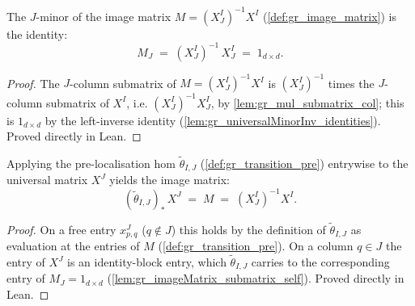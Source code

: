 \begin{lemma}

  \label{lem:gr_imageMatrix_submatrix_self}
  The \(J\)-minor of the image matrix \(M = (X^I_J)^{-1} X^I\)
  (\cref{def:gr_image_matrix}) is the identity:
  \[
    M_J \;=\; (X^I_J)^{-1}\, X^I_J \;=\; 1_{d\times d}.
  \]
\end{lemma}
\begin{proof}

\leanok
  The \(J\)-column submatrix of \(M = (X^I_J)^{-1} X^I\) is
  \((X^I_J)^{-1}\) times the \(J\)-column submatrix of \(X^I\), i.e.
  \((X^I_J)^{-1} X^I_J\), by \cref{lem:gr_mul_submatrix_col}; this is
  \(1_{d\times d}\) by the left-inverse identity
  (\cref{lem:gr_universalMinorInv_identities}). Proved directly in Lean.
\end{proof}


\begin{lemma}

  \label{lem:gr_universalMatrix_map_transitionPreMap}
  Applying the pre-localisation hom \(\tilde\theta_{I,J}\)
  (\cref{def:gr_transition_pre}) entrywise to the universal matrix \(X^J\) yields
  the image matrix:
  \[
    (\tilde\theta_{I,J})_\ast\, X^J \;=\; M \;=\; (X^I_J)^{-1} X^I .
  \]
\end{lemma}
\begin{proof}

\leanok
  On a free entry \(x^J_{p,q}\) (\(q \notin J\)) this holds by the definition of
  \(\tilde\theta_{I,J}\) as evaluation at the entries of \(M\)
  (\cref{def:gr_transition_pre}). On a column \(q \in J\) the entry of \(X^J\) is
  an identity-block entry, which \(\tilde\theta_{I,J}\) carries to the
  corresponding entry of \(M_J = 1_{d\times d}\)
  (\cref{lem:gr_imageMatrix_submatrix_self}). Proved directly in Lean.
\end{proof}

